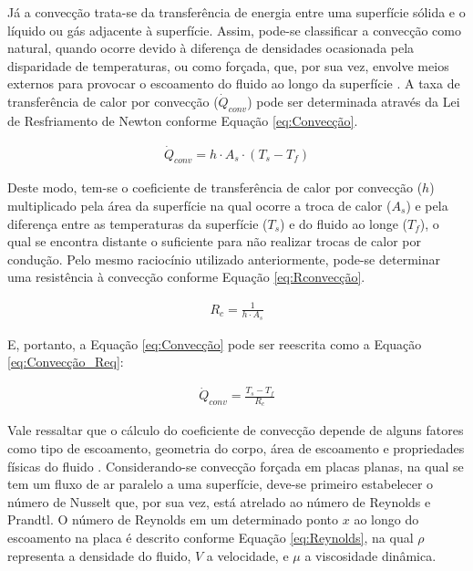\documentclass[acronym,symbols,table]{fei}
\begin{document}
Já a convecção trata-se da transferência de energia entre uma superfície sólida e o líquido ou gás adjacente à superfície. Assim, pode-se classificar a convecção como natural, quando ocorre devido à diferença de densidades ocasionada pela disparidade de temperaturas, ou como forçada, que, por sua vez, envolve meios externos para provocar o escoamento do fluido ao longo da superfície \cite{kreith1999mechanical}. A taxa de transferência de calor por convecção ($\dot{Q}_{conv}$) pode ser determinada através da Lei de Resfriamento de Newton conforme Equação \ref{eq:Convecção}.

\begin{equation} \label{eq:Convecção}
\begin{aligned}
    \dot{Q}_{conv}=h \cdot A_{s} \cdot (T_{s}-T_{f})
\end{aligned}
\end{equation}

Deste modo, tem-se o coeficiente de transferência de calor por convecção ($h$) multiplicado pela área da superfície na qual ocorre a troca de calor ($A_{s}$) e pela diferença entre as temperaturas da superfície ($T_{s}$) e do fluido ao longe ($T_{f}$), o qual se encontra distante o suficiente para não realizar trocas de calor por condução. Pelo mesmo raciocínio utilizado anteriormente, pode-se determinar uma resistência à convecção conforme Equação \ref{eq:Rconvecção}.

\begin{equation} \label{eq:Rconvecção}
\begin{aligned}
    {R}_{c}=\frac{1}{h \cdot A_{s}}
\end{aligned}
\end{equation}

E, portanto, a Equação \ref{eq:Convecção} pode ser reescrita como a Equação \ref{eq:Convecção_Req}:

\begin{equation} \label{eq:Convecção_Req}
\begin{aligned}
    \dot{Q}_{conv}=\frac{T_{s}-T_{f}}{{R}_{c}}
\end{aligned}
\end{equation}

Vale ressaltar que o cálculo do coeficiente de convecção depende de alguns fatores como tipo de escoamento, geometria do corpo, área de escoamento e propriedades físicas do fluido \cite{ozicsik1993heat}. Considerando-se convecção forçada em placas planas, na qual se tem um fluxo de ar paralelo a uma superfície, deve-se primeiro estabelecer o número de Nusselt que, por sua vez, está atrelado ao número de Reynolds e Prandtl. O número de Reynolds em um determinado ponto $x$ ao longo do escoamento na placa é descrito conforme Equação \ref{eq:Reynolds}, na qual $\rho$ representa a densidade do fluido, $V$ a velocidade, e $\mu$ a viscosidade dinâmica.
\end{document}
